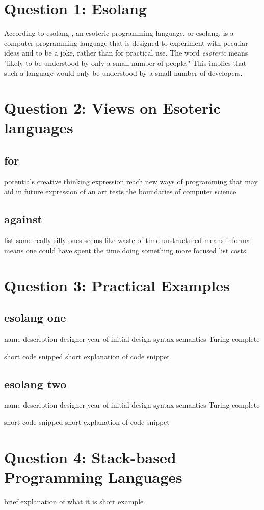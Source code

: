 \documentclass[a4paper]{article}
\begin{document}

\tableofcontents
\newpage

\section{Question 1: Esolang}
According to esolang \cite{esolang}, an esoteric programming language, or esolang, is a computer programming language that is designed to experiment with peculiar ideas and to be a joke, rather than for practical use. The word \textit{esoteric} means "likely to be understood by only a small number of people\cite{wikipedia}." This implies that such a language would only be understood by a small number of developers. 
\section{Question 2: Views on Esoteric languages}
	\subsection{for}
	potentials
		creative thinking
		expression
		reach new ways of programming that may aid in future
	expression of an art
	tests the boundaries of computer science
	
	\subsection{against}
	list some really silly ones
	seems like waste of time
	unstructured means informal means one could have spent the time doing something more focused
	list costs
\section{Question 3: Practical Examples}
	\subsection{esolang one}
	name
	description
		designer
		year of initial design
		syntax
		semantics
		Turing complete
		
	short code snipped
	short explanation of code snippet
	\subsection{esolang two}
	name
	description
		designer
		year of initial design
		syntax
		semantics
		Turing complete
		
	short code snipped
	short explanation of code snippet
\section{Question 4: Stack-based Programming Languages}
	brief explanation of what it is
	short example
\end{document}

